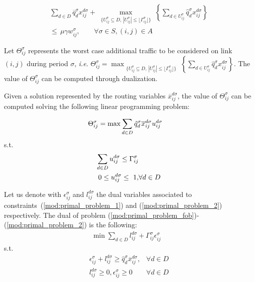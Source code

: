 \documentclass[final,5p,times,twocolumn]{elsarticle}
\begin{document}
\begin{eqnarray}\label{mod:link_cap_robust}
\sum_{d \in D} \overline{q}_d^{\sigma} x_{ij}^{d \sigma}+ 
\max_{\substack{\lbrace U_{ij}^{\sigma} \subseteq D,\,|U_{ij}^{\sigma}| \leq \lfloor \Gamma_{ij}^{\sigma} \rfloor\rbrace }} 
\left\lbrace \sum_{d \in U_{ij}^{\sigma}}\hat{q}_d^{\sigma} x_{ij}^{d \sigma} \right\rbrace\\
\nonumber  
\leq\, \mu \gamma w_{ij}^{\sigma}, \qquad \forall \sigma \in S, (i,j) \in A
\end{eqnarray}



Let $\Theta_{ij}^{\sigma}$ represents the worst case additional traffic to be considered on link $(i,j)$ during period $\sigma$, \textit{i.e.} $\Theta_{ij}^{\sigma} = \max_{\substack{\lbrace U_{ij}^{\sigma} \subseteq D,\,|U_{ij}^{\sigma}| \leq \lfloor \Gamma_{ij}^{\sigma} \rfloor\rbrace }} 
\left\lbrace \sum_{d \in U_{ij}^{\sigma}}\hat{q}_d^{\sigma} x_{ij}^{d \sigma} \right\rbrace$. 
The value of $\Theta_{ij}^{\sigma}$ can be computed through dualization.

Given a solution represented by the routing variables $\overline{x}_{ij}^{d \sigma}$, the value of $\Theta_{ij}^{\sigma}$ can be computed  solving the  following  linear programming problem:

\begin{eqnarray}\centering
\label{mod:primal_problem_fob}\Theta_{ij}^{\sigma}= \max \sum_{d \in D}\hat{q}_d^{\sigma} \overline{x}_{ij}^{d \sigma}u_{ij}^{d\sigma} & 
\end{eqnarray}
{s.t.}   
\begin{eqnarray}\centering
\label{mod:primal_problem_1}\sum_{d \in D}u_{ij}^{d\sigma} \leq \Gamma_{ij}^{\sigma} &  \\
\label{mod:primal_problem_2} 0 \leq u_{ij}^{d\sigma} \leq \ 1,  & \forall d \in D
\end{eqnarray}

Let us denote with $\epsilon_{ij}^{\sigma}$ and $l_{ij}^{d\sigma}$ the dual variables associated to constraints~(\ref{mod:primal_problem_1}) and (\ref{mod:primal_problem_2})  respectively. The dual of problem (\ref{mod:primal_problem_fob})-(\ref{mod:primal_problem_2}) is the following:
\begin{eqnarray}
\label{mod:dual_problem_fob}\min \sum_{d \in D} l_{ij}^{d\sigma}+\Gamma_{ij}^{\sigma}\epsilon_{ij}^{\sigma}& 
\end{eqnarray}
{s.t.}
\begin{eqnarray}
\label{mod:dual_problem_2} \epsilon_{ij}^{\sigma} + l_{ij}^{d\sigma} \geq \hat{q}_d^{\sigma}\overline{x}_{ij}^{d \sigma}, & \forall d \in D  \\
l_{ij}^{d\sigma} \geq 0, \epsilon_{ij}^{\sigma} \geq 0& \forall d \in D
\end{eqnarray}
\end{document}
